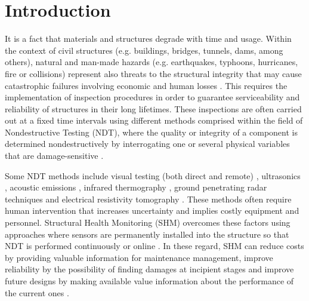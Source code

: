 \documentclass[twocolumn]{bmcart}%
\begin{document}



\section{Introduction}
It is a fact that materials and structures degrade with time and usage. Within the context of civil structures (e.g. buildings, bridges, tunnels, dams, among others), natural and man-made hazards (e.g. earthquakes, typhoons, hurricanes, fire or collisions) represent also threats to the structural integrity that may cause catastrophic failures involving economic and human losses \cite{Xu2017a}. This requires the implementation of inspection procedures in order to guarantee serviceability and reliability of structures in their long lifetimes. These inspections are often carried out at a fixed time intervals using different methods comprised within the field of Nondestructive Testing (NDT), where the quality or integrity of a component is determined nondestructively by interrogating one or several physical variables that are damage-sensitive \cite{Shull2002}.

Some NDT methods include visual testing (both direct and remote) \cite{Agnisarman2019}, ultrasonics \cite{Zhao2018}, acoustic emissions \cite{Meo2014}, infrared thermography \cite{Yamazaki2018}, ground penetrating radar techniques and electrical resistivity tomography \cite{Salin2018}. These methods often require human intervention that increases uncertainty and implies costly equipment and personnel. Structural Health Monitoring (SHM) overcomes these factors using approaches where sensors are permanently installed into the structure so that NDT is performed continuously or online \cite{Xu2017a}. In these regard, SHM can reduce costs by providing valuable information for maintenance management, improve reliability by the possibility of finding damages at incipient stages and improve future designs by making available value information about the performance of the current ones \cite{Ogai2018a}.
\end{document}
